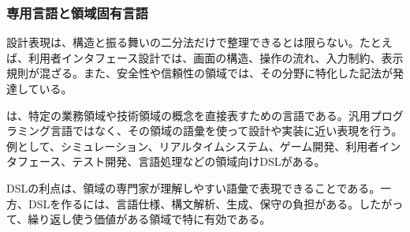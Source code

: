 \subsubsection{専用言語と領域固有言語}

設計表現は、構造と振る舞いの二分法だけで整理できるとは限らない。たとえば、利用者インタフェース設計では、画面の構造、操作の流れ、入力制約、表示規則が混ざる。また、安全性や信頼性の領域では、その分野に特化した記法が発達している。

 は、特定の業務領域や技術領域の概念を直接表すための言語である。汎用プログラミング言語ではなく、その領域の語彙を使って設計や実装に近い表現を行う。例として、シミュレーション、リアルタイムシステム、ゲーム開発、利用者インタフェース、テスト開発、言語処理などの領域向けDSLがある。

DSLの利点は、領域の専門家が理解しやすい語彙で表現できることである。一方、DSLを作るには、言語仕様、構文解析、生成、保守の負担がある。したがって、繰り返し使う価値がある領域で特に有効である。
